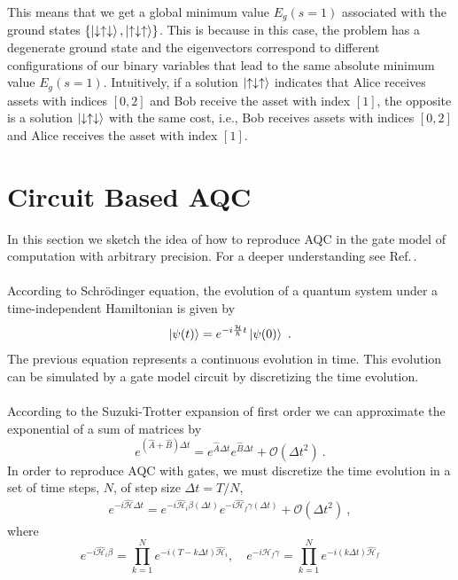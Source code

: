 This means that we get a global minimum value $E_{g}(s=1)$ associated with the ground states $\{\ket{\downarrow\uparrow\downarrow},\ket{\uparrow\downarrow\uparrow}\}$. This is because in this case, the problem has a degenerate ground state and the eigenvectors correspond to different configurations of our binary variables that lead to the same absolute minimum value $E_{g}(s=1)$. Intuitively, if a solution $\ket{\uparrow\downarrow\uparrow}$ indicates that Alice receives assets with indices $[0,2]$ and Bob receive the asset with index $[1]$, the opposite is a solution $\ket{\downarrow\uparrow\downarrow}$ with the same cost, i.e., Bob receives assets with indices $[0,2]$ and Alice receives the asset with index $[1]$.
\section{Circuit Based AQC}
In this section we sketch the idea of how to reproduce AQC in the gate model of computation with arbitrary precision. For a deeper understanding see Ref.\,\cite{Farhi2014AAlgorithm}.\\\\
According to Schrödinger equation, the evolution of a quantum system under a time-independent Hamiltonian is given by
\begin{equation}
\ket{\psi(t)} = e^{-i\frac{\mathcal{H}}{\hbar}t} \ket{\psi(0)}\ .
\end{equation}
The previous equation represents a continuous evolution in time. This evolution can be simulated by a gate model circuit by discretizing the time evolution.\\\\
According to the Suzuki-Trotter expansion of first order we can approximate the exponential of a sum of matrices by
\begin{equation}
        e^{\left(\hat{A}+\hat{B}\right)\Delta t} = e^{\hat{A}\Delta t}e^{\hat{B}\Delta t} + \mathcal{O}(\Delta t^{2})\ .
\end{equation}
In order to reproduce AQC with gates, we must discretize the time evolution in a set of time steps, $N$, of step size $\Delta t = T/N$,
\begin{align}
    e^{-i\hat{\mathcal{H}}\Delta t} = e^{-i\hat{\mathcal{H}}_{i}\beta(\Delta t)}e^{-i\hat{\mathcal{H}}_{f}\gamma(\Delta t)} + \mathcal{O}(\Delta t^{2})\ ,
\end{align}
where
\begin{equation}
    e^{-i\hat{\mathcal{H}}_{i}\beta} = \prod_{k=1}^{N}e^{-i\left(T-k\Delta t\right)\hat{\mathcal{H}}_{i}}, \quad e^{-i\hat{\mathcal{H}}_{f}\gamma} = \prod_{k=1}^{N}e^{-i\left(k\Delta t\right)\hat{\mathcal{H}}_{f}}
\end{equation}
